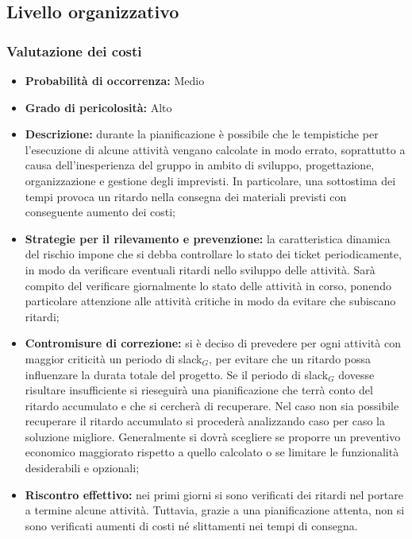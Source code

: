 \subsection{Livello organizzativo}

\subsubsection{Valutazione dei costi}
\hypertarget{subsubsect:costi}{}
\begin{itemize}
\item \textbf{Probabilità di occorrenza:} Medio
\item \textbf{Grado di pericolosità:} Alto
\item \textbf{Descrizione:} durante la pianificazione è possibile che le tempistiche per l'esecuzione di alcune attività vengano calcolate in modo errato, soprattutto a causa dell'inesperienza del gruppo in ambito di sviluppo, progettazione, organizzazione e gestione degli imprevisti. In particolare, una sottostima dei tempi provoca un ritardo nella consegna dei materiali previsti con conseguente aumento dei costi;

\item \textbf{Strategie per il rilevamento e prevenzione:} la caratteristica dinamica del rischio impone che si debba controllare lo stato dei ticket periodicamente, in modo da verificare eventuali ritardi nello sviluppo delle attività. Sarà compito del \ruoloResponsabile{} verificare giornalmente lo stato delle attività in corso, ponendo particolare attenzione alle attività critiche in modo da evitare che subiscano ritardi;


\item \textbf{Contromisure di correzione:} si è deciso di prevedere per ogni attività con maggior criticità un periodo di slack$_G$, per evitare che un ritardo possa influenzare la durata totale del progetto. Se il periodo di slack$_G$ dovesse risultare insufficiente si rieseguirà una pianificazione che terrà conto del ritardo accumulato e che si cercherà di recuperare. Nel caso non sia possibile recuperare il ritardo accumulato si procederà analizzando caso per caso la soluzione migliore. Generalmente si dovrà scegliere se proporre un preventivo economico maggiorato rispetto a quello calcolato o se limitare le funzionalità desiderabili e opzionali;

\item \textbf{Riscontro effettivo:} nei primi giorni si sono verificati dei ritardi nel portare a termine alcune attività. Tuttavia, grazie a una pianificazione attenta, non si sono verificati aumenti di costi né slittamenti nei tempi di consegna.

\end{itemize}


